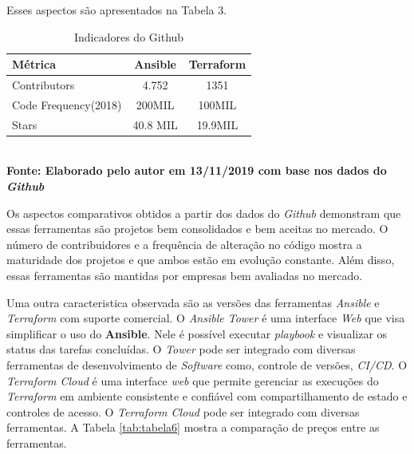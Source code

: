 Esses aspectos são apresentados na Tabela 3.

 
   \begin{table}[H]
	\centering
	\caption{\hspace{0.1cm} Indicadores do Github}
	\vspace{-0.3cm} %
	\label{tab:tabela5}
	\begin{tabular}{l|c|c}
  \hline
    \textbf{Métrica}	& \textbf{Ansible} & \textbf{Terraform} \\
    \hline
  Contributors & 4.752  & 1351\\
  Code Frequency(2018)  & 200MIL  &   100MIL  \\
  Stars & 40.8 MIL & 19.9MIL \\
     \hline
 \end{tabular}
 	\vspace{.1cm}  %
	\small
	{\footnotesize\\ \textbf{Fonte: Elaborado pelo autor em 13/11/2019 com base nos dados do \textit{Github}}}
\end{table}

Os aspectos comparativos obtidos a partir dos dados do \textit{Github} demonstram que essas ferramentas são projetos bem consolidados e bem aceitas no mercado. O número de contribuidores e a frequência de alteração no código mostra a maturidade dos projetos e que ambos estão em evolução constante. Além disso, essas ferramentas são mantidas por empresas bem avaliadas no mercado.  

Uma outra caracteristica observada são as versões das ferramentas \textit{Ansible} e \textit{Terraform} com suporte comercial. O \textit{Ansible Tower} é uma interface \textit{Web} que visa simplificar o uso do \textbf{Ansible}. Nele é possível executar \textit{playbook} e visualizar os status das tarefas concluídas. O \textit{Tower} pode ser integrado com diversas ferramentas de desenvolvimento de \textit{Software} como, controle de versões, \textit{CI/CD}. O \textit{Terraform Cloud} é uma interface \textit{web} que permite gerenciar as execuções do \textit{Terraform} em ambiente consistente e confiável com compartilhamento de estado e controles de acesso. O \textit{Terraform Cloud} pode ser integrado com diversas ferramentas.  A Tabela \ref{tab:tabela6} mostra a comparação de preços entre as ferramentas. 

